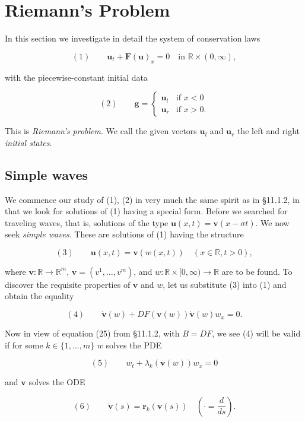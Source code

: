 \section{Riemann's Problem}\label{sec:riemanns-problem}

In this section we investigate in detail the system of conservation laws

$$(1) \qquad \mathbf{u}_t + \mathbf{F}(\mathbf{u})_x = 0 \quad \text{in } \mathbb{R}\times(0,\infty),$$

with the piecewise-constant initial data

$$(2) \qquad \mathbf{g} = \begin{cases} \mathbf{u}_l & \text{if } x<0 \\ \mathbf{u}_r & \text{if } x>0. \end{cases}$$

This is \textit{Riemann's problem}. We call the given vectors $\mathbf{u}_l$ and $\mathbf{u}_r$ the left and right \textit{initial states}.

\subsection{Simple waves}\label{sec:simple-waves}

We commence our study of (1), (2) in very much the same spirit as in \S11.1.2, in that we look for solutions of (1) having a special form. Before we searched for traveling waves, that is, solutions of the type $\mathbf{u}(x,t) = \mathbf{v}(x-\sigma t)$. We now seek \textit{simple waves}. These are solutions of (1) having the structure

$$(3) \qquad \mathbf{u}(x,t) = \mathbf{v}(w(x,t)) \quad (x\in\mathbb{R}, t>0),$$

where $\mathbf{v}:\mathbb{R}\to\mathbb{R}^m$, $\mathbf{v}=(v^1,\ldots,v^m)$, and $w:\mathbb{R}\times[0,\infty)\to\mathbb{R}$ are to be found. To discover the requisite properties of $\mathbf{v}$ and $w$, let us substitute (3) into (1) and obtain the equality

$$(4) \qquad \dot{\mathbf{v}}(w) + DF(\mathbf{v}(w))\dot{\mathbf{v}}(w)w_x = 0.$$

Now in view of equation (25) from \S11.1.2, with $B=DF$, we see (4) will be valid if for some $k\in\{1,\ldots,m\}$ $w$ solves the PDE

$$(5) \qquad w_t + \lambda_k(\mathbf{v}(w))w_x = 0$$

and $\mathbf{v}$ solves the ODE

$$(6) \qquad \dot{\mathbf{v}}(s) = \mathbf{r}_k(\mathbf{v}(s)) \quad \left(\cdot = \frac{d}{ds}\right).$$

